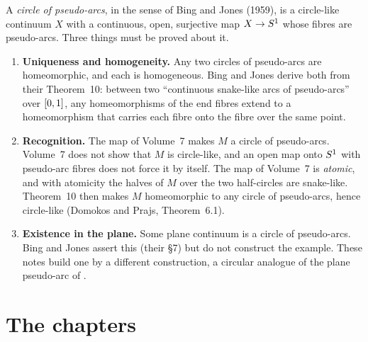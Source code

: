 A \emph{circle of pseudo-arcs}, in the sense of Bing and Jones (1959), is a circle-like continuum $X$ with a continuous, open, surjective map $X\to S^1$
whose fibres are pseudo-arcs. Three things must be proved about it.
\begin{enumerate}
\item \textbf{Uniqueness and homogeneity.} Any two circles of pseudo-arcs are homeomorphic, and each is homogeneous. Bing and Jones derive both from their
Theorem~10: between two ``continuous snake-like arcs of pseudo-arcs'' over $[0,1]$, any homeomorphisms of the end fibres extend to a homeomorphism that
carries each fibre onto the fibre over the same point.
\item \textbf{Recognition.} The map of Volume~7 makes $M$ a circle of pseudo-arcs. Volume~7 does not show that $M$ is circle-like, and an open map onto
$S^1$ with pseudo-arc fibres does not force it by itself. The map of Volume~7 is \emph{atomic}, and with atomicity the halves of $M$ over the two
half-circles are snake-like. Theorem~10 then makes $M$ homeomorphic to any circle of pseudo-arcs, hence circle-like (Domokos and Prajs, Theorem~6.1).
\item \textbf{Existence in the plane.} Some plane continuum is a circle of pseudo-arcs. Bing and Jones assert this (their \S7) but do not construct the
example. These notes build one by a different construction, a circular analogue of the plane pseudo-arc of .
\end{enumerate}

\section{The chapters}

